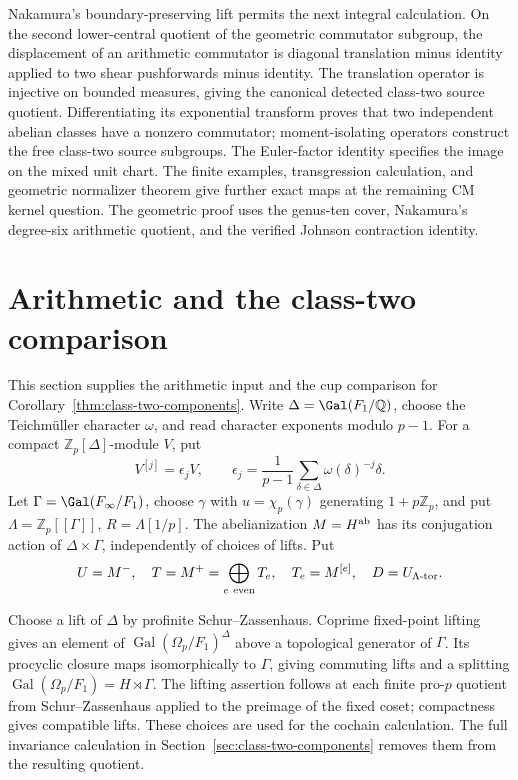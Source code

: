\documentclass[11pt]{article}
\theoremstyle{definition}\newtheorem{definition}[theorem]{Definition}
\newcommand{\Z}{\mathbb Z}\newcommand{\Q}{\mathbb Q}
\begin{document}
Nakamura's boundary-preserving lift permits the next integral calculation. On the second lower-central quotient of the geometric commutator subgroup, the displacement of an arithmetic commutator is diagonal translation minus identity applied to two shear pushforwards minus identity. The translation operator is injective on bounded measures, giving the canonical detected class-two source quotient. Differentiating its exponential transform proves that two independent abelian classes have a nonzero commutator; moment-isolating operators construct the free class-two source subgroups. The Euler-factor identity specifies the image on the mixed unit chart. The finite examples, transgression calculation, and geometric normalizer theorem give further exact maps at the remaining CM kernel question. The geometric proof uses the genus-ten cover, Nakamura's degree-six arithmetic quotient, and the verified Johnson contraction identity.

\section{Arithmetic and the class-two comparison}\label{sec:abelian}

This section supplies the arithmetic input and the cup comparison
for Corollary~\ref{thm:class-two-components}.
Write $\Delta=\Gal(F_1/\Q)$, choose the Teichm\"uller character
$\omega$, and read character exponents modulo $p-1$.
For a compact $\Z_p[\Delta]$-module $V$, put
\[
 V^{[j]}=\epsilon_jV,\qquad
 \epsilon_j=\frac1{p-1}\sum_{\delta\in\Delta}\omega(\delta)^{-j}\delta.
\]
Let $\Gamma=\Gal(F_\infty/F_1)$, choose $\gamma$ with
$u=\chi_p(\gamma)$ generating $1+p\Z_p$, and put
$\Lambda=\Z_p[[\Gamma]]$, $R=\Lambda[1/p]$.
The abelianization $M=H^{\rm ab}$ has its conjugation action of
$\Delta\times\Gamma$, independently of choices of lifts. Put
\[
 U=M^-,\quad T=M^+=\bigoplus_{e\ {\rm even}}T_e,\quad
 T_e=M^{[e]},\quad D=U_{\Lambda\text{-tor}}.
\]

Choose a lift of $\Delta$ by profinite Schur--Zassenhaus.
Coprime fixed-point lifting gives an element of
$\operatorname{Gal}(\Omega_p/F_1)^\Delta$ above a topological
generator of $\Gamma$. Its procyclic closure maps isomorphically
to $\Gamma$, giving commuting lifts and a splitting
$\operatorname{Gal}(\Omega_p/F_1)=H\rtimes\Gamma$.
The lifting assertion follows at each finite pro-$p$ quotient
from Schur--Zassenhaus applied to the preimage of the fixed
coset; compactness gives compatible lifts. These choices are
used for the cochain calculation. The full invariance calculation
in Section~\ref{sec:class-two-components} removes them from the
resulting quotient.
\end{document}
